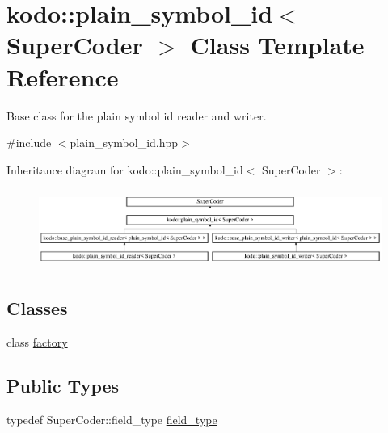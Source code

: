 \hypertarget{classkodo_1_1plain__symbol__id}{\section{kodo\-:\-:plain\-\_\-symbol\-\_\-id$<$ Super\-Coder $>$ Class Template Reference}
\label{classkodo_1_1plain__symbol__id}
}


Base class for the plain symbol id reader and writer.  




{\ttfamily \#include $<$plain\-\_\-symbol\-\_\-id.\-hpp$>$}

Inheritance diagram for kodo\-:\-:plain\-\_\-symbol\-\_\-id$<$ Super\-Coder $>$\-:\begin{figure}[H]
\begin{center}
\leavevmode
\includegraphics[height=2.610723cm]{classkodo_1_1plain__symbol__id}
\end{center}
\end{figure}
\subsection*{Classes}
\begin{DoxyCompactItemize}
\item 
class \hyperlink{classkodo_1_1plain__symbol__id_1_1factory}{factory}
\end{DoxyCompactItemize}
\subsection*{Public Types}
\begin{DoxyCompactItemize}
\item 
typedef Super\-Coder\-::field\-\_\-type \hyperlink{classkodo_1_1plain__symbol__id_addf86dd636b783ce5f72562b76196214}{field\-\_\-type}
\begin{DoxyCompactList}\small\item\em \end{DoxyCompactList}\end{DoxyCompactItemize}
